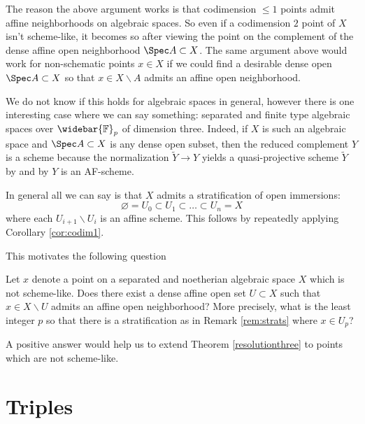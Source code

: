 \documentclass[12pt]{amsart}
\begin{document}
\begin{remark} \label{rem:strats} The reason the above argument works is that codimension $\leq 1$ points admit affine neighborhoods on algebraic spaces. So even if a codimension $2$ point of $X$ isn't scheme-like, it becomes so after viewing the point on the complement of the dense affine open neighborhood $\Spec A \subset X$. The same argument above would work for non-schematic points $x \in X$ if we could find a desirable dense open $\Spec A \subset X$ so that $x \in X \smallsetminus A$ admits an affine open neighborhood. 

We do not know if this holds for algebraic spaces in general, however there is one interesting case where we can say something: separated and finite type algebraic spaces over $\widebar{\mathbb{F}}_p$ of dimension three. Indeed, if $X$ is such an algebraic space and $\Spec A \subset X$ is any dense open subset, then the reduced complement $Y$ is a scheme because the normalization $\tilde{Y} \to Y$ yields a quasi-projective scheme $\tilde{Y}$ by \cite[Cor. 2.11]{MR146182} and by \cite[Thm. 3.3]{SurfaceRes} $Y$ is an AF-scheme.

In general all we can say is that $X$ admits a stratification of open immersions:
\[\varnothing=U_{0} \subset U_1 \subset \dots \subset U_n=X\]
where each $U_{i+1} \smallsetminus U_{i}$ is an affine scheme. This follows by repeatedly applying Corollary \ref{cor:codim1}. \end{remark} 

This motivates the following question

\begin{Question} Let $x$ denote a point on a separated and noetherian algebraic space $X$ which is not scheme-like. Does there exist a dense affine open set $U \subset X$ such that $x \in X \smallsetminus U$ admits an affine open neighborhood? More precisely, what is the least integer $p$ so that there is a stratification as in Remark \ref{rem:strats} where $x \in U_p$? \end{Question}

A positive answer would help us to extend Theorem \ref{resolutionthree} to points which are not scheme-like.
\section{Triples}
\label{Triples}
\end{document}

